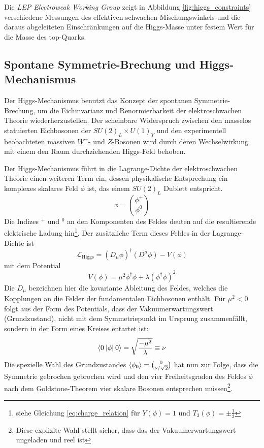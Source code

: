 Die \textit{LEP Electroweak Working Group} zeigt in Abbildung
\ref{fig:higgs_constraints} verschiedene Messungen des effektiven schwachen
Mischungswinkels und die daraus abgeleiteten Einschränkungen auf die
Higgs-Masse unter festem Wert für die Masse des top-Quarks.



\subsection{Spontane Symmetrie-Brechung und Higgs-Mechanismus}
\label{theory:higgs}
Der Higgs-Mechanismus benutzt das Konzept der spontanen Symmetrie- Brechung, um
die Eichinvarianz und Renormierbarkeit der elektroschwachen Theorie
wiederherzustellen. Der scheinbare Widerspruch zwischen den masselos
statuierten Eichbosonen der $SU(2)_L \times U(1)_Y$ und den experimentell
beobachteten massiven $W^\pm$- und $Z$-Bosonen wird durch deren Wechselwirkung
mit einem den Raum durchziehenden Higgs-Feld behoben.

Der Higgs-Mechanismus führt in die Lagrange-Dichte der elektroschwachen Theorie
einen weiteren Term ein, dessen physikalische Entsprechung ein komplexes
skalares Feld $\phi$ ist, das einem $SU(2)_L$ Dublett entspricht.
\begin{equation}
    \phi = \binom{\phi^+}{\phi^0}
\end{equation}
Die Indizes $^+$ und $^0$ an den Komponenten des Feldes deuten auf die
resultierende elektrische Ladung hin\footnote{siehe Gleichung
\ref{eq:charge_relation} für $Y(\phi)=1$ und $T_3(\phi)=\pm\tfrac{1}{2}$}.
Der zusätzliche Term dieses Feldes in der Lagrange-Dichte ist
\begin{equation}
    \mathcal{L}_\text{Higgs} = (D_\mu\phi)^\dagger(D^\mu\phi) - V(\phi)
\end{equation}
mit dem Potential
\begin{equation}
    V(\phi) = \mu^2\phi^\dagger\phi + \lambda (\phi^\dagger\phi )^2
\end{equation}
Die $D_\mu$ bezeichnen hier die kovariante Ableitung des Feldes, welches die
Kopplungen an die Felder der fundamentalen Eichbosonen enthält. Für $\mu^2<0$
folgt aus der Form des Potentials, dass der Vakuumerwartungswert
(Grundzustand), nicht mit dem Symmetriepunkt im Ursprung zusammenfällt, sondern
in der Form eines Kreises entartet ist:
\begin{equation}
    \braket{0\:|\phi|\:0} = \sqrt{\frac{-\mu^2}{\lambda}} \equiv \nu 
\end{equation}
Die spezielle Wahl des Grundzustandes $\braket{\phi_0}=\binom{0}{\nu/\sqrt{2}}$
hat nun zur Folge, dass die Symmetrie gebrochen gebrochen wird und den vier
Freiheitsgraden des Feldes $\phi$ nach dem Goldstone-Theorem vier skalare
Bosonen entsprechen müssen\footnote{Diese explizite Wahl stellt sicher, dass
das der Vakuumerwartungswert ungeladen und reel ist}.

